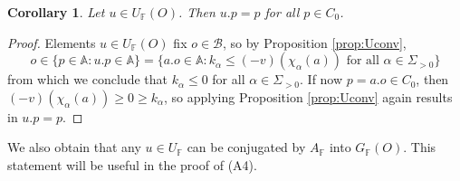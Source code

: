 \documentclass[12pt]{amsart}
\newcommand{\F}{\mathbb{F} }
\newcommand{\frakg}{\mathfrak{g}}
\newcommand{\A}{\mathbb{A}}
\newcommand{\B}{\mathcal{B}}
\numberwithin{equation}{section}
\newtheorem{corollary}[theorem]{Corollary}
\theoremstyle{remark} %
\begin{document}
\begin{corollary}\label{cor:NO_fixes_s0}
	Let $u\in U_\F(O)$. Then $u.p = p$ for all $p \in C_0$.
\end{corollary}
\begin{proof}
	Elements $u\in U_\F(O)$ fix $o \in \B$, so by Proposition \ref{prop:Uconv},
	$$
	o \in \{p \in \A \colon u.p \in \A\} = \{ a.o \in \A \colon   k_\alpha \leq (-v)\left(\chi_\alpha \left(a\right)\right) \text{ for all } \alpha \in \Sigma_{>0}  \}
	$$
	from which we conclude that $k_\alpha \leq 0$ for all $\alpha \in \Sigma_{>0}$. If now $p=a.o \in C_0$, then $(-v)(\chi_\alpha(a)) \geq 0 \geq k_\alpha$, so applying Proposition \ref{prop:Uconv} again results in $u.p = p$.
\end{proof}

We also obtain that any $u\in U_\F$ can be conjugated by $A_\F$ into $G_\F(O)$. This statement will be useful in the proof of (A4).
\end{document}
